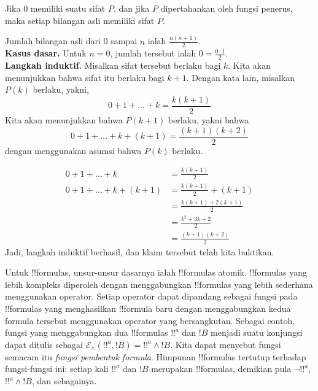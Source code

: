 \documentclass[../../../include/open-logic-section]{subfiles}
\begin{document}
\begin{defn}
Jika 0 memiliki suatu sifat $P$, dan jika $P$ dipertahankan oleh fungsi
penerus, maka setiap bilangan asli memiliki sifat $P$.
\end{defn}

\begin{ex} Jumlah bilangan asli dari 0 sampai $n$ ialah $\frac{n(n+1)}{2}$. \\

\textbf{Kasus dasar.} Untuk $n=0$, jumlah tersebut ialah $0=
\frac{0\cdot 1}{2}$.\\

\textbf{Langkah induktif.} Misalkan sifat tersebut berlaku bagi $k$. Kita
akan menunjukkan bahwa sifat itu berlaku bagi $k+1$. Dengan kata lain,
misalkan $P(k)$ berlaku, yakni,
\[ 0 + 1 + \ldots + k = \frac{k(k+1)}{2} \]
Kita akan menunjukkan bahwa $P(k+1)$ berlaku, yakni bahwa
\[ 0 + 1 + \ldots + k + (k+1) = \frac{(k+1)(k+2)}{2} \]
dengan menggunakan asumsi bahwa $P(k)$ berlaku.

\begin{align*}
0 + 1 + \ldots + k &= \frac{k(k+1)}{2} \tag{Asumsi} \\
0 + 1 + \ldots + k + (k+1) &= \frac{k(k+1)}{2} + (k+1)
\tag{Tambahkan $k+1$ pada kedua ruas} \\
&= \frac{k(k+1) + 2(k+1)}{2} \\
&= \frac{k^2 + 3k + 2}{2} \\
&=\frac{(k+1)(k+2)}{2}
\end{align*}
Jadi, langkah induktif berhasil, dan klaim tersebut telah kita buktikan.
\end{ex}

\begin{explain}
Untuk !!{formula}s, unsur-unsur dasarnya ialah !!{formula}s atomik.
!!{formula}s yang lebih kompleks diperoleh dengan menggabungkan
!!{formula}s yang lebih sederhana menggunakan operator. Setiap operator dapat
dipandang sebagai fungsi pada !!{formula}s yang menghasilkan !!{formula}
baru dengan menggabungkan kedua formula tersebut menggunakan operator yang
bersangkutan. Sebagai contoh, fungsi yang menggabungkan dua !!{formula}s
$!!^a$ dan $!B$ menjadi suatu konjungsi dapat ditulis sebagai
$\mathcal E _\land (!!^a, !B) = !!^a \land !B$. Kita dapat menyebut fungsi
semacam itu \emph{fungsi pembentuk formula}. Himpunan !!{formula}s tertutup
terhadap fungsi-fungsi ini: setiap kali $!!^a$ dan $!B$ merupakan
!!{formula}s, demikian pula $\lnot !!^a$, $!!^a \land !B$, dan sebagainya.
\end{explain}
\end{document}
